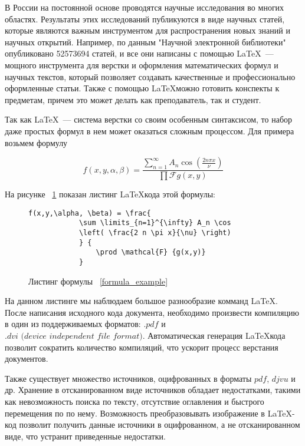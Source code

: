 \introduction %

В России на постоянной основе проводятся научные исследования во многих областях. Результаты этих исследований публикуются в виде научных статей, которые являются важным инструментом для распространения новых знаний и научных открытий.
Например, по данным "Научной электронной библиотеки" опубликовано 52573694 \cite{eLib} статей, и все они написаны с помощью \LaTeX ~--- мощного инструмента для верстки и оформления математических формул и научных текстов, который позволяет создавать качественные и профессионально оформленные статьи. 
Также с помощью \LaTeX \quad можно готовить конспекты к предметам, причем это может делать как преподаватель, так и студент.

Так как \LaTeX ~--- система верстки со своим особенным синтаксисом, то набор даже простых формул в нем может оказаться сложным процессом.
Для примера возьмем формулу

\begin{equation}
    \label{formula_example}
        f(x,y,\alpha, \beta) = \frac{\sum \limits_{n=1}^{\infty} 
        A_n \cos \left( \frac{2 n \pi x}{\nu} \right)} {\prod \mathcal{F} {g(x,y)} } 
\end{equation}

На рисунке ~\ref{formula_listing} показан листинг \LaTeX \quad кода этой формулы:

\begin{figure}
    \begin{lstlisting}[language={[LaTeX]Tex}]
        f(x,y,\alpha, \beta) = \frac{
            \sum \limits_{n=1}^{\infty} A_n \cos 
            \left( \frac{2 n \pi x}{\nu} \right)
            } {
                \prod \mathcal{F} {g(x,y)} 
            } 
    \end{lstlisting}
    \caption{Листинг формулы ~\ref{formula_example}}
    \label{formula_listing}
\end{figure}

На данном листинге мы наблюдаем большое разнообразие комманд \LaTeX.
После написания исходного кода документа, необходимо произвести компиляцию в один из поддерживаемых форматов: $.pdf$ и $\textit{.dvi (device independent file format)}$. Автоматическая генерация \LaTeX кода позволит сократить количество компиляций, что ускорит процесс верстания документов.

Также существует множество источников, оцифрованных в форматы $pdf$, $djvu$ и др. Хранение в отсканированном виде источников обладает недостатками, такими как невозможность поиска по тексту, отсутствие оглавления и быстрого перемещения по по нему.
Возможность преобразовывать изображение в \LaTeX-код позволит получить данные источники в оцифрованном, а не отсканированном виде, что устранит приведенные недостатки.

